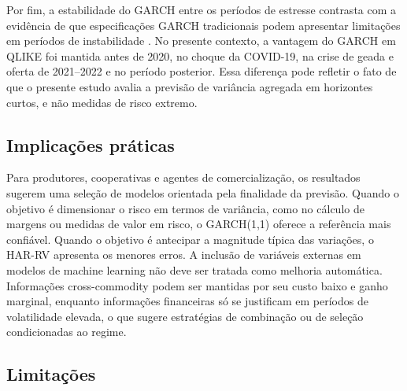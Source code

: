 \documentclass[a4paper,fleqn]{cas-sc}
\begin{document}
Por fim, a estabilidade do GARCH entre os períodos de estresse contrasta com a evidência de que especificações GARCH tradicionais podem apresentar limitações em períodos de instabilidade \citep{Brun2026GARCHCoffeeRisk}. No presente contexto, a vantagem do GARCH em QLIKE foi mantida antes de 2020, no choque da COVID-19, na crise de geada e oferta de 2021--2022 e no período posterior. Essa diferença pode refletir o fato de que o presente estudo avalia a previsão de variância agregada em horizontes curtos, e não medidas de risco extremo.

\subsection{Implicações práticas}
\label{subsec:disc_practical}

Para produtores, cooperativas e agentes de comercialização, os resultados sugerem uma seleção de modelos orientada pela finalidade da previsão. Quando o objetivo é dimensionar o risco em termos de variância, como no cálculo de margens ou medidas de valor em risco, o GARCH(1,1) oferece a referência mais confiável. Quando o objetivo é antecipar a magnitude típica das variações, o HAR-RV apresenta os menores erros. A inclusão de variáveis externas em modelos de machine learning não deve ser tratada como melhoria automática. Informações cross-commodity podem ser mantidas por seu custo baixo e ganho marginal, enquanto informações financeiras só se justificam em períodos de volatilidade elevada, o que sugere estratégias de combinação ou de seleção condicionadas ao regime.

\subsection{Limitações}
\label{subsec:disc_limitations}
\end{document}
